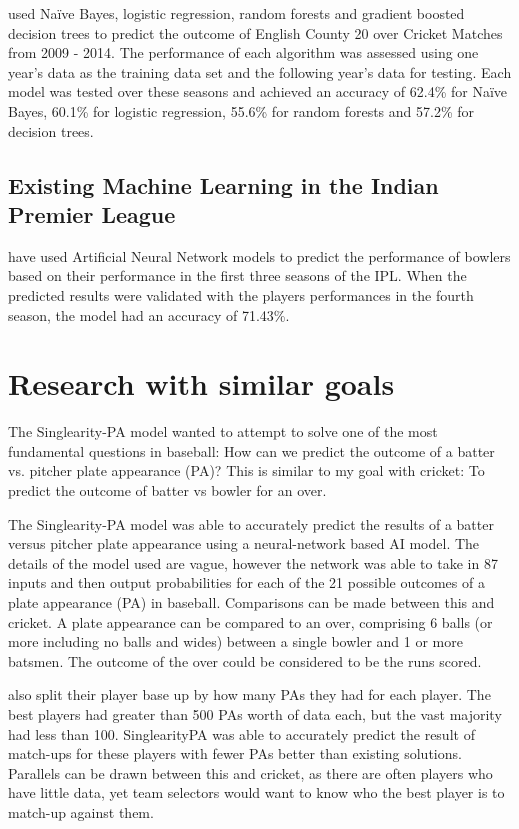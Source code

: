\documentclass[12pt,a4paper]{report}
\theoremstyle{definition}
\begin{document}
\citet{KampakisStylianos2015} used Naïve Bayes, logistic regression, random forests and gradient boosted decision trees to predict the outcome of English County 20 over Cricket Matches from 2009 - 2014. 
The performance of each algorithm was assessed using one year's data as the training data set and the following year's data for testing. 
Each model was tested over these seasons and achieved an accuracy of 62.4\% for Naïve Bayes, 60.1\% for logistic regression, 55.6\% for random forests and 57.2\% for decision trees.

\subsection{Existing Machine Learning in the Indian Premier League}

\citet{Saikia2012} have used Artificial Neural Network models to predict the performance of bowlers based on their performance in the first three seasons of the IPL. 
When the predicted results were validated with the players performances in the fourth season, the model had an accuracy of 71.43\%.

\section{Research with similar goals}

The Singlearity-PA model \citep{silver2021baseball} wanted to attempt to solve one of the most fundamental questions in baseball:	 How can we	predict the outcome of a batter	vs. pitcher plate appearance (PA)? 
This is similar to my goal with cricket:  To predict the outcome of batter vs bowler for an over.

The Singlearity-PA model \citep{silver2021baseball} was able to accurately predict the results of a batter versus pitcher plate appearance using a neural-network based AI model. 
The details of the model used are vague, however the network was able to take in 87 inputs and then output probabilities for each of the 21 possible outcomes of a plate appearance (PA) in baseball. 
Comparisons can be made between this and cricket. 
A plate appearance can be compared to an over, comprising 6 balls (or more including no balls and wides) between a single bowler and 1 or more batsmen. 
The outcome of the over could be considered to be the runs scored. 

\citet{silver2021baseball} also split their player base up by how many PAs they had for each player. 
The best players had greater than 500 PAs worth of data each, but the vast majority had less than 100. 
SinglearityPA was able to accurately predict the result of match-ups for these players with fewer PAs better than existing solutions. 
Parallels can be drawn between this and cricket, as there are often players who have little data, yet team selectors would want to know who the best player is to match-up against them.
\end{document}
